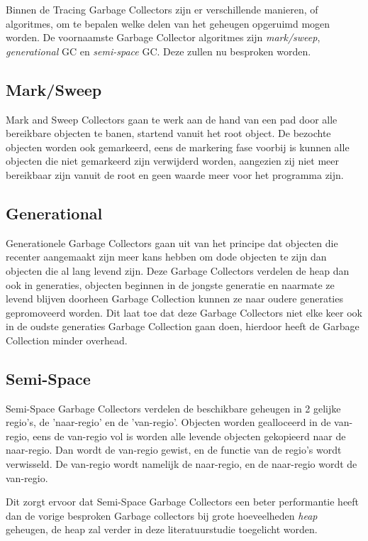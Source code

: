 Binnen de Tracing Garbage Collectors zijn er verschillende manieren, of algoritmes, om te bepalen welke delen van het geheugen opgeruimd mogen worden.
De voornaamste Garbage Collector algoritmes zijn \textit{mark/sweep}, \textit{generational} GC en \textit{semi-space} GC.
Deze zullen nu besproken worden.
\subsection{Mark/Sweep}
Mark and Sweep Collectors gaan te werk aan de hand van een pad door alle bereikbare objecten te banen, startend vanuit het root object. De bezochte objecten worden ook gemarkeerd, eens de markering fase voorbij is kunnen alle objecten die niet gemarkeerd zijn verwijderd worden, aangezien zij niet meer bereikbaar zijn vanuit de root en geen waarde meer voor het programma zijn.



\subsection{Generational}
\label{sec:generational}    
Generationele Garbage Collectors gaan uit van het principe dat objecten die recenter aangemaakt zijn meer kans hebben om dode objecten te zijn dan objecten die al lang levend zijn.
Deze Garbage Collectors verdelen de heap dan ook in generaties, objecten beginnen in de jongste generatie en naarmate ze levend blijven doorheen Garbage Collection kunnen ze naar oudere generaties gepromoveerd worden.
Dit laat toe dat deze Garbage Collectors niet elke keer ook in de oudste generaties Garbage Collection gaan doen, hierdoor heeft de Garbage Collection minder overhead.




\subsection{Semi-Space}
\label{sec:semi-space}    
Semi-Space Garbage Collectors verdelen de beschikbare geheugen in 2 gelijke regio's, de 'naar-regio' en de 'van-regio'.
Objecten worden gealloceerd in de van-regio, eens de van-regio vol is worden alle levende objecten gekopieerd naar de naar-regio.
Dan wordt de van-regio gewist, en de functie van de regio's wordt verwisseld.
De van-regio wordt namelijk de naar-regio, en de naar-regio wordt de van-regio.\autocite{Byers2007}

Dit zorgt ervoor dat Semi-Space Garbage Collectors een beter performantie heeft dan de vorige besproken Garbage collectors bij grote hoeveelheden \textit{heap} geheugen, de heap zal verder in deze literatuurstudie toegelicht worden.

